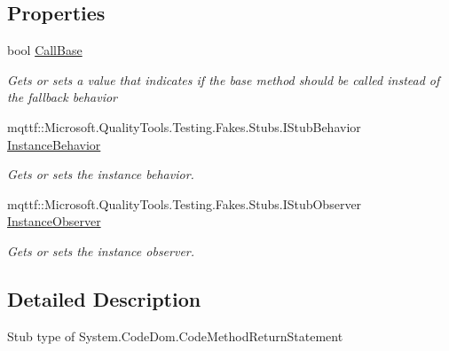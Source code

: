 \subsection*{Properties}
\begin{DoxyCompactItemize}
\item 
bool \hyperlink{class_system_1_1_code_dom_1_1_fakes_1_1_stub_code_method_return_statement_adbd8db2e9efbd130c69a62c06cef38b4}{Call\-Base}
\begin{DoxyCompactList}\small\item\em Gets or sets a value that indicates if the base method should be called instead of the fallback behavior\end{DoxyCompactList}\item 
mqttf\-::\-Microsoft.\-Quality\-Tools.\-Testing.\-Fakes.\-Stubs.\-I\-Stub\-Behavior \hyperlink{class_system_1_1_code_dom_1_1_fakes_1_1_stub_code_method_return_statement_a36fd0873db37ab071d781a259684f6c2}{Instance\-Behavior}
\begin{DoxyCompactList}\small\item\em Gets or sets the instance behavior.\end{DoxyCompactList}\item 
mqttf\-::\-Microsoft.\-Quality\-Tools.\-Testing.\-Fakes.\-Stubs.\-I\-Stub\-Observer \hyperlink{class_system_1_1_code_dom_1_1_fakes_1_1_stub_code_method_return_statement_a94be9a3c0c7285364d76384880172672}{Instance\-Observer}
\begin{DoxyCompactList}\small\item\em Gets or sets the instance observer.\end{DoxyCompactList}\end{DoxyCompactItemize}


\subsection{Detailed Description}
Stub type of System.\-Code\-Dom.\-Code\-Method\-Return\-Statement




